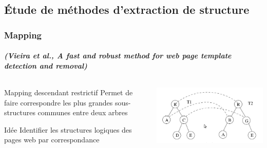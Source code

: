 \documentclass[]{beamer}
\begin{document}
\subsection{Étude de méthodes d'extraction de structure}
\begin{frame}
\frametitle{Mapping}
\framesubtitle{\textit{(Vieira et al., A fast and robust method for web page template detection and removal)}}
\begin{columns}
	\begin{column}{5cm}
	\begin{block}{Mapping descendant restrictif}
		Permet de faire correspondre les plus grandes sous-structures communes entre deux arbres
	\end{block}
	\begin{block}{Idée}
		Identifier les structures logiques des pages web par correspondance
	\end{block}
	\end{column}
	\begin{column}{5cm}
		\includegraphics[scale=0.3]{img/mapping.jpg}
	\end{column}
\end{columns}
\end{frame}
\end{document}
